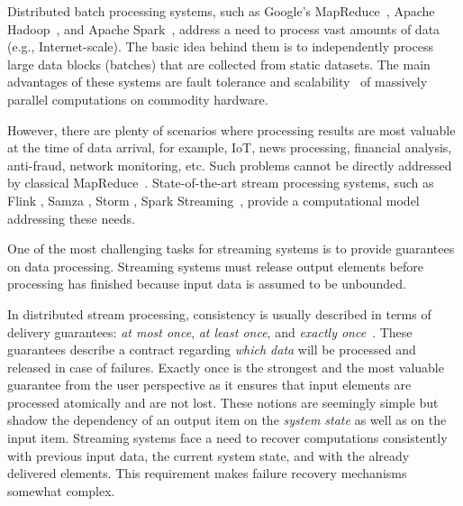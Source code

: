 
\label {fs-intro-seciton}

Distributed batch processing systems, such as Google's MapReduce~\cite{Dean:2008:MSD:1327452.1327492}, Apache Hadoop~\cite{hadoop2009hadoop}, and Apache Spark~\cite{Zaharia:2016:ASU:3013530.2934664}, address a need to process vast amounts of data (e.g., Internet-scale). 
The basic   idea behind them is to independently process large data blocks (batches) that are collected from static datasets. 
The main advantages of these systems are fault tolerance and scalability~\cite{borthakur2011apache} of massively parallel computations on commodity hardware.

However, there are plenty of scenarios where processing results are most valuable at the time of data arrival, for example, IoT, news processing, financial analysis, anti-fraud, network monitoring, etc. 
Such problems cannot be directly addressed by classical MapReduce~\cite{Doulkeridis:2014:SLA:2628707.2628782}. 
State-of-the-art stream processing systems, such as Flink \cite{carbone2015apache}, Samza \cite{Noghabi:2017:SSS:3137765.3137770}, Storm \cite{apache:storm}, Spark Streaming~\cite{Zaharia:2012:DSE:2342763.2342773},   provide a computational model addressing these needs.

One of the most challenging tasks for streaming systems is to provide guarantees on data processing. 
Streaming systems must release output elements before processing has finished because input data is assumed to be unbounded. 

In distributed stream processing, consistency is usually described in terms of delivery guarantees: {\em at most once}, {\em at least once}, and {\em exactly once}~\cite{carbone2015apache}. 
These guarantees describe a contract regarding {\em which data} will be  processed and released in case of failures. 
Exactly once is the strongest and the most valuable guarantee from the user perspective as it ensures that input elements are processed atomically and are not lost. These notions are seemingly simple but shadow  the dependency   of  an output item on the {\em system state} as well as on the  input item. 
Streaming systems face a need to recover computations consistently with previous input data, the current system state, and with the already delivered elements.
This requirement makes failure recovery mechanisms somewhat complex. 

